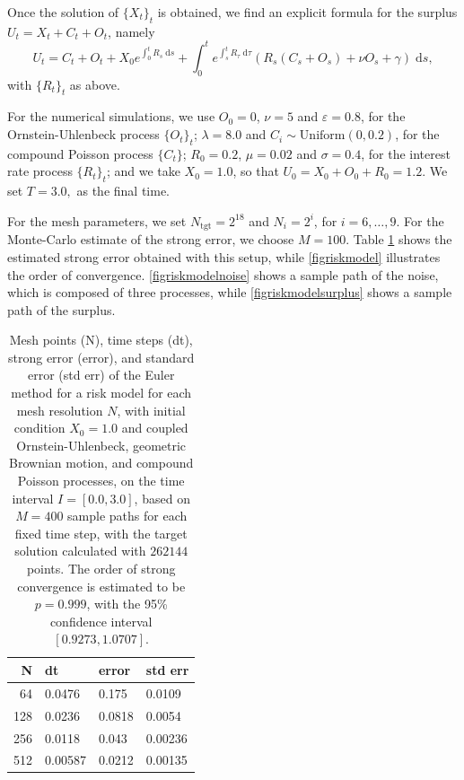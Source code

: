 \documentclass[reqno,12pt]{amsart}
\theoremstyle{plain} %
\theoremstyle{definition} %
\begin{document}
Once the solution of $\{X_t\}_t$ is obtained, we find an explicit formula for the surplus $U_t = X_t + C_t + O_t$, namely
\[
  U_t = C_t + O_t + X_0 e^{\int_0^t R_s\;\mathrm{d}s} + \int_0^t e^{\int_s^t R_\tau\;\mathrm{d}\tau} (R_s (C_s + O_s) + \nu O_s + \gamma)\;\mathrm{d}s,
\]
with $\{R_t\}_t$ as above.

For the numerical simulations, we use $O_0 = 0$, $\nu = 5$ and $\varepsilon = 0.8$, for the Ornstein-Uhlenbeck process $\{O_t\}_t$; $\lambda = 8.0$ and $C_i \sim \mathrm{Uniform}(0, 0.2)$, for the compound Poisson process $\{C_t\}$; $R_0 = 0.2$, $\mu = 0.02$ and $\sigma = 0.4$, for the interest rate process $\{R_t\}_t$; and we take $X_0 = 1.0$, so that $U_0 = X_0 + O_0 + R_0 = 1.2$. We set $T = 3.0,$ as the final time.

For the mesh parameters, we set $N_{\textrm{tgt}} = 2^{18}$ and $N_i = 2^i$, for $i=6, \ldots, 9$. For the Monte-Carlo estimate of the strong error, we choose $M = 100.$ Table \ref{tableriskmodel} shows the estimated strong error obtained with this setup, while \cref{figriskmodel} illustrates the order of convergence. \cref{figriskmodelnoise} shows a sample path of the noise, which is composed of three processes, while \cref{figriskmodelsurplus} shows a sample path of the surplus.

\begin{table}
    \begin{tabular}[htb]{|r|l|l|l|}
        \hline N & dt & error & std err \\
        \hline \hline
        64 & 0.0476 & 0.175 & 0.0109 \\
        128 & 0.0236 & 0.0818 & 0.0054 \\
        256 & 0.0118 & 0.043 & 0.00236 \\
        512 & 0.00587 & 0.0212 & 0.00135 \\
        \hline
    \end{tabular}
    \bigskip

    \caption{Mesh points (N), time steps (dt), strong error (error), and standard error (std err) of the Euler method for a risk model for each mesh resolution $N$, with initial condition $X_0 = 1.0$ and coupled Ornstein-Uhlenbeck, geometric Brownian motion, and compound Poisson processes, on the time interval $I = [0.0, 3.0]$, based on $M = 400$ sample paths for each fixed time step, with the target solution calculated with $262144$ points. The order of strong convergence is estimated to be $p = 0.999$, with the 95\% confidence interval $[0.9273, 1.0707]$.}
    \label{tableriskmodel}
\end{table}
\end{document}
